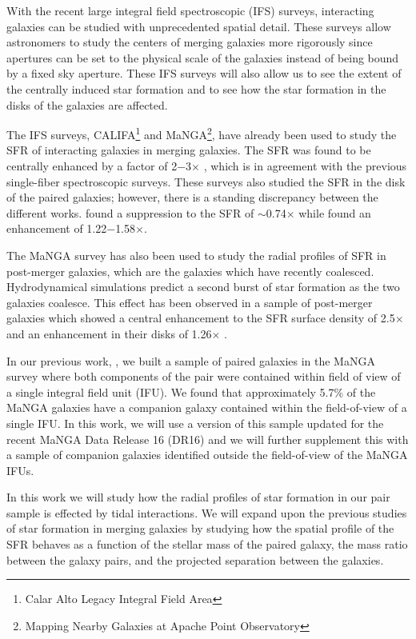\documentclass[iop,revtex4,twocolumn,apj,numberedappendix,appendixfloats]{emulateapj}
\begin{document}
With the recent large integral field spectroscopic (IFS) surveys, interacting galaxies can be studied with unprecedented spatial detail. These surveys allow astronomers to study the centers of merging galaxies more rigorously since apertures can be set to the physical scale of the galaxies instead of being bound by a fixed sky aperture. These IFS surveys will also allow us to see the extent of the centrally induced star formation and to see how the star formation in the disks of the galaxies are affected. 

The IFS surveys, CALIFA\footnote{Calar Alto Legacy Integral Field Area} and MaNGA\footnote{Mapping Nearby Galaxies at Apache Point Observatory}, have already been used to study the SFR of interacting galaxies in merging galaxies. The SFR was found to be centrally enhanced by a factor of 2$-$3$\times$ \citep{Barrera-Ballesteros:2015, Pan:2019}, which is in agreement with the previous single-fiber spectroscopic surveys. These surveys also studied the SFR in the disk of the paired galaxies; however, there is a standing discrepancy between the different works. \citet{Barrera-Ballesteros:2015} found a suppression to the SFR of $\sim$0.74$\times$ while \citet{Pan:2019} found an enhancement of 1.22$-$1.58$\times$. 

The MaNGA survey has also been used to study the radial profiles of SFR in post-merger galaxies, which are the galaxies which have recently coalesced. Hydrodynamical simulations predict a second burst of star formation as the two galaxies coalesce. This effect has been observed in a sample of post-merger galaxies which showed a central enhancement to the SFR surface density of 2.5$\times$ and an enhancement in their disks of 1.26$\times$ \citep{Thorp:2019}.

In our previous work, \citet{Fu:2018}, we built a sample of paired galaxies in the MaNGA survey where both components of the pair were contained within field of view of a single integral field unit (IFU). We found that approximately 5.7\% of the MaNGA galaxies have a companion galaxy contained within the field-of-view of a single IFU. In this work, we will use a version of this sample updated for the recent MaNGA Data Release 16 (DR16) \citep{Ahumada:2020} and we will further supplement this with a sample of companion galaxies identified outside the field-of-view of the MaNGA IFUs. 

In this work we will study how the radial profiles of star formation in our pair sample is effected by tidal interactions. We will expand upon the previous studies of star formation in merging galaxies by studying how the spatial profile of the SFR behaves as a function of the stellar mass of the paired galaxy, the mass ratio between the galaxy pairs, and the projected separation between the galaxies. 
\end{document}
